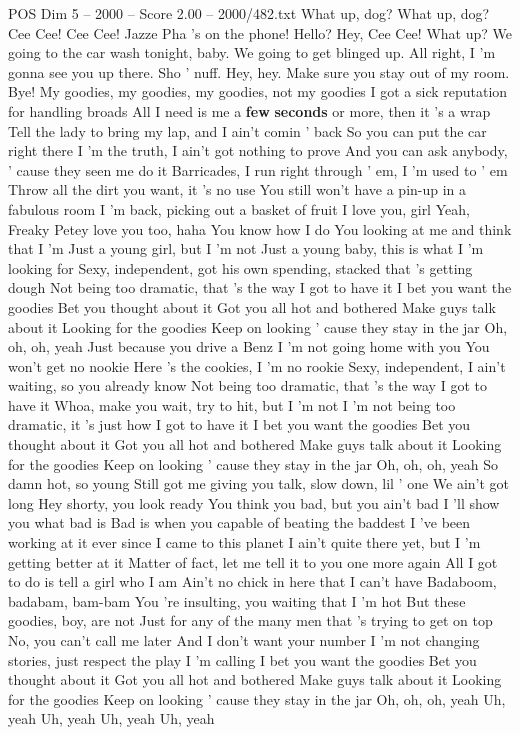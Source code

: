 \begin{textsample}{POS Dim 5 – 2000 – Score 2.00 – 2000/482.txt}  \label{ex:f5_pos_001}
What up, dog?
What up, dog?
Cee Cee!
Cee Cee!
Jazze Pha 's on the phone!
Hello?
Hey, Cee Cee!
What up?
We going to the car wash tonight, baby.
We going to get blinged up.
All right, I 'm gonna see you up there.
Sho ' nuff.
Hey, hey.
Make sure you stay out of my room.
Bye!
My goodies, my goodies, my goodies, not my goodies I got a sick reputation for handling broads All I need is me a \textbf{few} \textbf{seconds} or more, then it 's a wrap Tell the lady to bring my lap, and I ain't comin ' back So you can put the car right there I 'm the truth, I ain't got nothing to prove And you can ask anybody, ' cause they seen me do it Barricades, I run right through ' em, I 'm used to ' em Throw all the dirt you want, it 's no use You still won't have a pin-up in a fabulous room I 'm back, picking out a basket of fruit I love you, girl Yeah, Freaky Petey love you too, haha You know how I do You looking at me and think that I 'm Just a young girl, but I 'm not Just a young baby, this is what I 'm looking for Sexy, independent, got his own spending, stacked that 's getting dough Not being too dramatic, that 's the way I got to have it I bet you want the goodies Bet you thought about it Got you all hot and bothered Make guys talk about it Looking for the goodies Keep on looking ' cause they stay in the jar Oh, oh, oh, yeah Just because you drive a Benz I 'm not going home with you You won't get no nookie Here 's the cookies, I 'm no rookie Sexy, independent, I ain't waiting, so you already know Not being too dramatic, that 's the way I got to have it Whoa, make you wait, try to hit, but I 'm not I 'm not being too dramatic, it 's just how I got to have it I bet you want the goodies Bet you thought about it Got you all hot and bothered Make guys talk about it Looking for the goodies Keep on looking ' cause they stay in the jar Oh, oh, oh, yeah So damn hot, so young Still got me giving you talk, slow down, lil ' one We ain't got long Hey shorty, you look ready You think you bad, but you ain't bad I 'll show you what bad is Bad is when you capable of beating the baddest I 've been working at it ever since I came to this planet I ain't quite there yet, but I 'm getting better at it Matter of fact, let me tell it to you one more again All I got to do is tell a girl who I am Ain't no chick in here that I can't have Badaboom, badabam, bam-bam You 're insulting, you waiting that I 'm hot But these goodies, boy, are not Just for any of the many men that 's trying to get on top No, you can't call me later And I don't want your number I 'm not changing stories, just respect the play I 'm calling I bet you want the goodies Bet you thought about it Got you all hot and bothered Make guys talk about it Looking for the goodies Keep on looking ' cause they stay in the jar Oh, oh, oh, yeah Uh, yeah Uh, yeah Uh, yeah Uh, yeah

\end{textsample}

